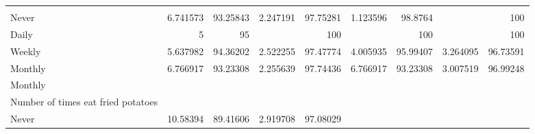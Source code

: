 \documentclass{article}
\begin{document}
\begin{tabular}{lllllllll}
  \multicolumn{1}{|r}{} &
  \multicolumn{1}{r}{} &
  \multicolumn{1}{r}{} &
  \multicolumn{1}{r}{} &
  \multicolumn{1}{r}{} &
  \multicolumn{1}{r}{} &
  \multicolumn{1}{r}{} &
  \multicolumn{1}{r}{} \\
\multicolumn{1}{l}{\hspace{7em}Never} &
  \multicolumn{1}{|r}{6.741573} &
  \multicolumn{1}{r}{93.25843} &
  \multicolumn{1}{r}{2.247191} &
  \multicolumn{1}{r}{97.75281} &
  \multicolumn{1}{r}{1.123596} &
  \multicolumn{1}{r}{98.8764} &
  \multicolumn{1}{r}{} &
  \multicolumn{1}{r}{100} \\
\multicolumn{1}{l}{\hspace{7em}Daily} &
  \multicolumn{1}{|r}{5} &
  \multicolumn{1}{r}{95} &
  \multicolumn{1}{r}{} &
  \multicolumn{1}{r}{100} &
  \multicolumn{1}{r}{} &
  \multicolumn{1}{r}{100} &
  \multicolumn{1}{r}{} &
  \multicolumn{1}{r}{100} \\
\multicolumn{1}{l}{\hspace{7em}Weekly} &
  \multicolumn{1}{|r}{5.637982} &
  \multicolumn{1}{r}{94.36202} &
  \multicolumn{1}{r}{2.522255} &
  \multicolumn{1}{r}{97.47774} &
  \multicolumn{1}{r}{4.005935} &
  \multicolumn{1}{r}{95.99407} &
  \multicolumn{1}{r}{3.264095} &
  \multicolumn{1}{r}{96.73591} \\
\multicolumn{1}{l}{\hspace{7em}Monthly} &
  \multicolumn{1}{|r}{6.766917} &
  \multicolumn{1}{r}{93.23308} &
  \multicolumn{1}{r}{2.255639} &
  \multicolumn{1}{r}{97.74436} &
  \multicolumn{1}{r}{6.766917} &
  \multicolumn{1}{r}{93.23308} &
  \multicolumn{1}{r}{3.007519} &
  \multicolumn{1}{r}{96.99248} \\
\multicolumn{1}{l}{\hspace{5em}Monthly} &
  \multicolumn{1}{|r}{} &
  \multicolumn{1}{r}{} &
  \multicolumn{1}{r}{} &
  \multicolumn{1}{r}{} &
  \multicolumn{1}{r}{} &
  \multicolumn{1}{r}{} &
  \multicolumn{1}{r}{} &
  \multicolumn{1}{r}{} \\
\multicolumn{1}{l}{\hspace{6em}Number of times eat fried potatoes} &
  \multicolumn{1}{|r}{} &
  \multicolumn{1}{r}{} &
  \multicolumn{1}{r}{} &
  \multicolumn{1}{r}{} &
  \multicolumn{1}{r}{} &
  \multicolumn{1}{r}{} &
  \multicolumn{1}{r}{} &
  \multicolumn{1}{r}{} \\
\multicolumn{1}{l}{\hspace{7em}Never} &
  \multicolumn{1}{|r}{10.58394} &
  \multicolumn{1}{r}{89.41606} &
  \multicolumn{1}{r}{2.919708} &
  \multicolumn{1}{r}{97.08029} &

\end{tabular}
\end{document}
